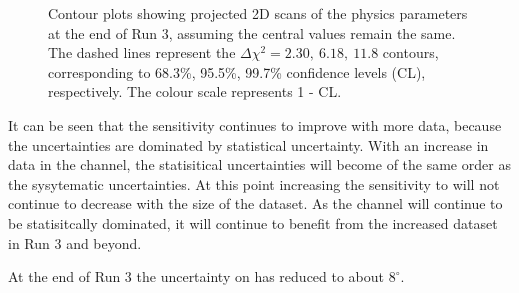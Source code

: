 \begin{figure}[h]
\centering
{}
\caption{Contour plots showing projected 2D scans of the physics parameters at the end of Run 3, assuming the central values remain the same. The dashed lines represent the $\Delta \chi^2 = 2.30,\ 6.18,\ 11.8$ contours, corresponding to 68.3\%, 95.5\%, 99.7\% confidence levels (CL), respectively. The colour scale represents 1 - CL.}
\label{gammadiniplotsrun3}
\end{figure}

It can be seen that the sensitivity continues to improve with more data, because the uncertainties are dominated by statistical uncertainty. With an increase in data in the \decay{\Bm}{\D\Km} channel, the statisitical uncertainties will become of the same order as the sysytematic uncertainties. At this point increasing the sensitivity to \Pgamma will not continue to decrease with the size of the dataset. As the \btodkst channel will continue to be statisitcally dominated, it will continue to benefit from the increased dataset in Run 3 and beyond.

At the end of Run 3 the uncertainty on \Pgamma has reduced to about $8^{\circ}$. 


\clearpage
